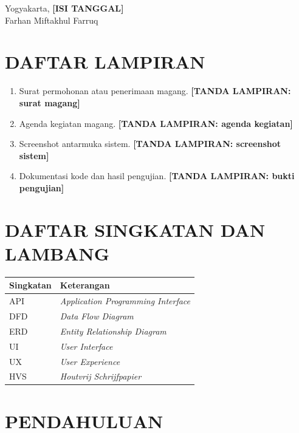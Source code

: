 \documentclass[12pt,a4paper,oneside]{report}
\newcommand{\placeholder}[1]{\textbf{[#1]}}
\newcommand{\namamahasiswa}{Farhan Miftakhul Farruq}
\begin{document}
\vspace{1cm}
\begin{flushright}
Yogyakarta, \placeholder{ISI TANGGAL}\\
\vspace{1.5cm}
\namamahasiswa
\end{flushright}

\tableofcontents
\clearpage
\listoffigures
\clearpage
\listoftables
\clearpage

\chapter*{DAFTAR LAMPIRAN}

\begin{enumerate}
  \item Surat permohonan atau penerimaan magang. \placeholder{TANDA LAMPIRAN: surat magang}
  \item Agenda kegiatan magang. \placeholder{TANDA LAMPIRAN: agenda kegiatan}
  \item Screenshot antarmuka sistem. \placeholder{TANDA LAMPIRAN: screenshot sistem}
  \item Dokumentasi kode dan hasil pengujian. \placeholder{TANDA LAMPIRAN: bukti pengujian}
\end{enumerate}

\chapter*{DAFTAR SINGKATAN DAN LAMBANG}

\begin{longtable}{p{}p{}}
\toprule
Singkatan & Keterangan\\
\midrule
API & \textit{Application Programming Interface}\\
DFD & \textit{Data Flow Diagram}\\
ERD & \textit{Entity Relationship Diagram}\\
UI & \textit{User Interface}\\
UX & \textit{User Experience}\\
HVS & \textit{Houtvrij Schrijfpapier}\\
\bottomrule
\end{longtable}

\clearpage
{}

\chapter{PENDAHULUAN}
\end{document}
